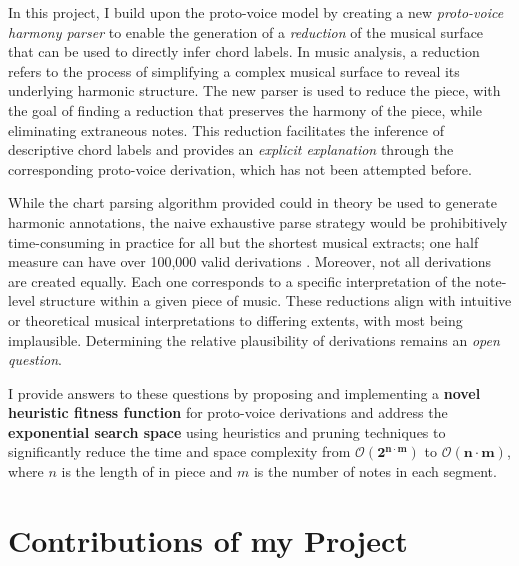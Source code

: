 \documentclass[12pt,a4paper,twoside,openany]{report} \usepackage[pdfborder={0 0 0}]{hyperref}    %
\theoremstyle{definition} \newtheorem{definition}{Definition}[section]
\begin{document}
    In this project, I build upon the proto-voice model by creating a new \textit{proto-voice harmony parser} to enable the generation of a \textit{reduction} of the musical
    surface that can be used to directly infer chord labels. In music analysis, a reduction refers to the process
    of simplifying a complex musical surface to reveal its underlying harmonic structure. 
    The new parser is used to reduce the piece, with the goal of finding a reduction that preserves the harmony of
    the piece, while eliminating extraneous notes. This reduction facilitates the inference of descriptive chord labels and provides an
    \textit{explicit explanation} through the corresponding proto-voice derivation, which has not been attempted before. 

    While the chart parsing algorithm provided \cite{finkensiepProtovoicesModelTonal2021} could in theory be used to
    generate harmonic annotations, the naive exhaustive parse strategy would be prohibitively time-consuming in
    practice for all but the shortest musical extracts; one half measure can have over 100,000 valid derivations
    \cite{finkensiepStructureFreePolyphony2023}. Moreover, not all derivations are created equally. Each one
    corresponds to a specific interpretation of the note-level structure within a given piece of music. These
    reductions align with intuitive or theoretical musical interpretations to differing extents, with most being implausible. 
    Determining the relative plausibility of derivations remains an \textit{open question}. 

    I provide answers to these questions by proposing and implementing a \textbf{novel heuristic fitness function} for
    proto-voice derivations and address the \textbf{exponential search space} using heuristics and pruning
    techniques to significantly reduce the time and space complexity from $\bm{\mathcal{O}(2^{n \cdot m})}$
      to $\bm{\mathcal{O}(n \cdot m)}$, where $n$ is the length of in piece and $m$ is the number of notes in each segment. 

    \section{Contributions of my Project}

\end{document}
